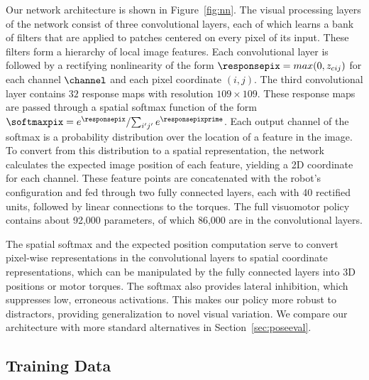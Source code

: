 \documentclass[final]{IEEEtran}
\begin{document}
Our network architecture is shown in Figure~\ref{fig:nn}. The visual processing layers of the network consist of three convolutional layers, each of which learns a bank of filters that are applied to patches centered on every pixel of its input. These filters form a hierarchy of local image features. Each convolutional layer is followed by a rectifying nonlinearity of the form $\responsepix=max(0,z_{cij})$ for each channel $\channel$ and each pixel coordinate $(i,j)$. The third convolutional layer contains $32$ response maps with resolution $109 \times 109$. These response maps are passed through a spatial softmax function of the form $\softmaxpix = {e^{\responsepix}}/{\sum_{i' j'}{e^{\responsepixprime}}}$.
Each output channel of the softmax is a probability distribution over the location of a feature in the image. To convert from this distribution to a spatial representation, the network calculates the expected image position of each feature, yielding a 2D coordinate for each channel. These feature points are concatenated with the robot's configuration and fed through two fully connected layers, each with 40 rectified units, followed by linear connections to the torques. The full visuomotor policy contains about 92,000 parameters, of which 86,000 are in the convolutional layers.

The spatial softmax and the expected position computation serve to convert pixel-wise representations in the convolutional layers to spatial coordinate representations, which can be manipulated by the fully connected layers into 3D positions or motor torques. The softmax also provides lateral inhibition, which suppresses low, erroneous activations.
This makes our policy more robust to distractors, providing generalization to novel visual variation. We compare our architecture with more standard alternatives in Section~\ref{sec:poseeval}.


\subsection{Training Data}
\label{sec:training}
\end{document}
